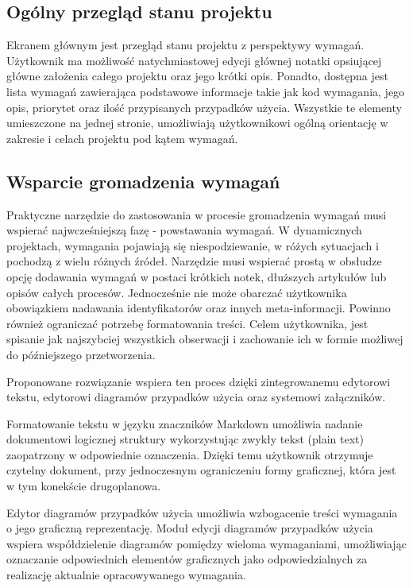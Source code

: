     \subsection{Ogólny przegląd stanu projektu}
      Ekranem głównym jest przegląd stanu projektu z perspektywy wymagań. Użytkownik ma możliwość natychmiastowej edycji głównej notatki opsiującej główne założenia całego projektu oraz jego krótki opis. Ponadto, dostępna jest lista wymagań zawierająca podstawowe informacje takie jak kod wymagania, jego opis, priorytet oraz ilość przypisanych przypadków użycia. Wszystkie te elementy umieszczone na jednej stronie, umożliwiają użytkownikowi ogólną orientację w zakresie i celach projektu pod kątem wymagań. 

    \subsection{Wsparcie gromadzenia wymagań}
      Praktyczne narzędzie do zastosowania w procesie gromadzenia wymagań musi wspierać najwcześniejszą fazę - powstawania wymagań. W dynamicznych projektach, wymagania pojawiają się niespodziewanie, w różych sytuacjach i pochodzą z wielu różnych źródeł. Narzędzie musi wspierać prostą w obsłudze opcję dodawania wymagań w postaci krótkich notek, dłuższych artykułów lub opisów całych procesów. Jednocześnie nie może obarczać użytkownika obowiązkiem nadawania identyfikatorów oraz innych meta-informacji. Powinno również ograniczać potrzebę formatowania treści. Celem użytkownika, jest spisanie jak najszybciej wszystkich obserwacji i zachowanie ich w formie możliwej do późniejszego przetworzenia.

      Proponowane rozwiązanie wspiera ten proces dzięki zintegrowanemu edytorowi tekstu, edytorowi diagramów przypadków użycia oraz systemowi załączników.
      
      Formatowanie tekstu w języku znaczników Markdown \cite{Grub04} umożliwia nadanie dokumentowi logicznej struktury wykorzystując zwykły tekst (plain text) zaopatrzony w odpowiednie oznaczenia. Dzięki temu użytkownik otrzymuje czytelny dokument, przy jednoczesnym ograniczeniu formy graficznej, która jest w tym konekście drugoplanowa.

      Edytor diagramów przypadków użycia umożliwia wzbogacenie treści wymagania o jego graficzną reprezentację. Moduł edycji diagramów przypadków użycia wspiera współdzielenie diagramów pomiędzy wieloma wymaganiami, umożliwiając oznaczanie odpowiednich elementów graficznych jako odpowiedzialnych za realizację aktualnie opracowywanego wymagania.

